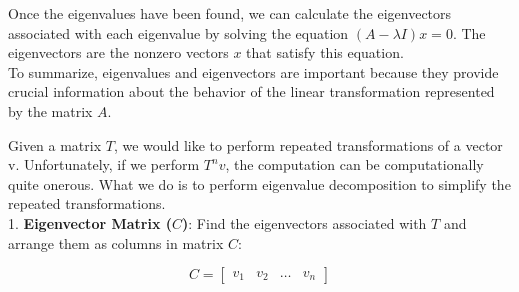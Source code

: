 \begin{minipage}{0.48\textwidth}
	Once the eigenvalues have been found, we can calculate the eigenvectors associated with each eigenvalue by solving the equation $(A-\lambda I)x=0$. The eigenvectors are the nonzero vectors $x$ that satisfy this equation. \\
	
	To summarize, eigenvalues and eigenvectors are important because they provide crucial information about the behavior of the linear transformation represented by the matrix $A$.
	
	\divider
	
	Given a matrix $T$, we would like to perform repeated transformations of a vector v. Unfortunately, if we perform $T^n v$, the computation can be computationally quite onerous. What we do is to perform eigenvalue decomposition to simplify the repeated transformations. \\
	
	1. \textbf{Eigenvector Matrix ($C$)}: Find the eigenvectors associated with $T$ and arrange them as columns in matrix $C$:
	
	\[ C = \begin{bmatrix} v_1 & v_2 & \dots & v_n \end{bmatrix} \]
	
\end{minipage}
\hfill
